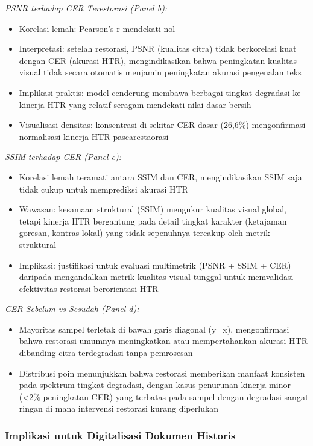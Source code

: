 \documentclass[journal]{IEEEtran}
\begin{document}
\textit{PSNR terhadap CER Terestorasi (Panel b):}
\begin{itemize}
    \item Korelasi lemah: Pearson's r mendekati nol
    \item Interpretasi: setelah restorasi, PSNR (kualitas citra) tidak berkorelasi kuat dengan CER (akurasi HTR), mengindikasikan bahwa peningkatan kualitas visual tidak secara otomatis menjamin peningkatan akurasi pengenalan teks
    \item Implikasi praktis: model cenderung membawa berbagai tingkat degradasi ke kinerja HTR yang relatif seragam mendekati nilai dasar bersih
    \item Visualisasi densitas: konsentrasi di sekitar CER dasar (26,6\%) mengonfirmasi normalisasi kinerja HTR pascarestaorasi
\end{itemize}

\textit{SSIM terhadap CER (Panel c):}
\begin{itemize}
    \item Korelasi lemah teramati antara SSIM dan CER, mengindikasikan SSIM saja tidak cukup untuk memprediksi akurasi HTR
    \item Wawasan: kesamaan struktural (SSIM) mengukur kualitas visual global, tetapi kinerja HTR bergantung pada detail tingkat karakter (ketajaman goresan, kontras lokal) yang tidak sepenuhnya tercakup oleh metrik struktural
    \item Implikasi: justifikasi untuk evaluasi multimetrik (PSNR + SSIM + CER) daripada mengandalkan metrik kualitas visual tunggal untuk memvalidasi efektivitas restorasi berorientasi HTR
\end{itemize}

\textit{CER Sebelum vs Sesudah (Panel d):}
\begin{itemize}
    \item Mayoritas sampel terletak di bawah garis diagonal (y=x), mengonfirmasi bahwa restorasi umumnya meningkatkan atau mempertahankan akurasi HTR dibanding citra terdegradasi tanpa pemrosesan
    \item Distribusi poin menunjukkan bahwa restorasi memberikan manfaat konsisten pada spektrum tingkat degradasi, dengan kasus penurunan kinerja minor (<2\% peningkatan CER) yang terbatas pada sampel dengan degradasi sangat ringan di mana intervensi restorasi kurang diperlukan
\end{itemize}

\subsubsection{Implikasi untuk Digitalisasi Dokumen Historis}
\end{document}
